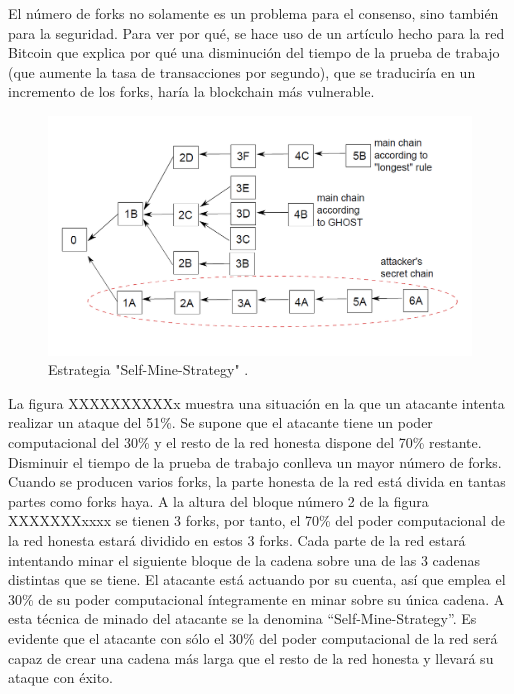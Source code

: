 El número de forks no solamente es un problema para el consenso, sino también para la seguridad. Para ver por qué, se hace uso de un artículo hecho para la red Bitcoin \cite{ghost} que explica por qué una disminución del tiempo de la prueba de trabajo (que aumente la tasa de transacciones por segundo), que se traduciría en un incremento de los forks, haría la blockchain más vulnerable. 

\begin{figure}
	\centering
	\includegraphics[width=1\textwidth]{imagenes/figura5.PNG}
	\caption{\label{fig1}Estrategia "Self-Mine-Strategy" \cite{ghost}.}
\end{figure}

La figura XXXXXXXXXXx muestra una situación en la que un atacante intenta realizar un ataque del 51\%. Se supone que el atacante tiene un poder computacional del 30\% y el resto de la red honesta dispone del 70\% restante. Disminuir el tiempo de la prueba de trabajo conlleva un mayor número de forks. Cuando se producen varios forks, la parte honesta de la red está divida en tantas partes como forks haya. A la altura del bloque número 2 de la figura XXXXXXXxxxx se tienen 3 forks, por tanto, el 70\% del poder computacional de la red honesta estará dividido en estos 3 forks. Cada parte de la red estará intentando minar el siguiente bloque de la cadena sobre una de las 3 cadenas distintas que se tiene. El atacante está actuando por su cuenta, así que emplea el 30\% de su poder computacional íntegramente en minar sobre su única cadena. A esta técnica de minado del atacante se la denomina “Self-Mine-Strategy”. Es evidente que el atacante con sólo el 30\% del poder computacional de la red será capaz de crear una cadena más larga que el resto de la red honesta y llevará su ataque con éxito. \newline

